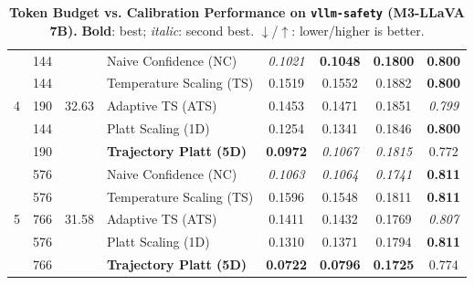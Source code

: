 \begin{table}[t]
\begin{tabular}{ccclcccc}
\multirow{5}{*}{4} & 144 & \multirow{5}{*}{32.63} & Naive Confidence (NC) & \textit{0.1021} & \textbf{0.1048} & \textbf{0.1800} & \textbf{0.800} \\
 & 144 &  & Temperature Scaling (TS) & 0.1519 & 0.1552 & 0.1882 & \textbf{0.800} \\
 & 190 &  & Adaptive TS (ATS) & 0.1453 & 0.1471 & 0.1851 & \textit{0.799} \\
 & 144 &  & Platt Scaling (1D) & 0.1254 & 0.1341 & 0.1846 & \textbf{0.800} \\
 & 190 &  & \textbf{Trajectory Platt (5D)} & \textbf{0.0972} & \textit{0.1067} & \textit{0.1815} & 0.772 \\
\midrule
\multirow{5}{*}{5} & 576 & \multirow{5}{*}{31.58} & Naive Confidence (NC) & \textit{0.1063} & \textit{0.1064} & \textit{0.1741} & \textbf{0.811} \\
 & 576 &  & Temperature Scaling (TS) & 0.1596 & 0.1548 & 0.1811 & \textbf{0.811} \\
 & 766 &  & Adaptive TS (ATS) & 0.1411 & 0.1432 & 0.1769 & \textit{0.807} \\
 & 576 &  & Platt Scaling (1D) & 0.1310 & 0.1371 & 0.1794 & \textbf{0.811} \\
 & 766 &  & \textbf{Trajectory Platt (5D)} & \textbf{0.0722} & \textbf{0.0796} & \textbf{0.1725} & 0.774 \\
\bottomrule
\end{tabular}
\caption{\textbf{Token Budget vs. Calibration Performance on \texttt{vllm-safety} (M3-LLaVA 7B).} \textbf{Bold}: best; \textit{italic}: second best. $\downarrow$/$\uparrow$: lower/higher is better.}
\label{tab:token_budget_vllm_safety_m3}
\end{table}

